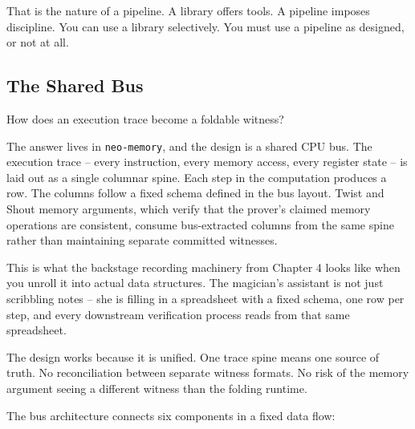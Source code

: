 \documentclass[
  11pt,
  openany]{report}
\begin{document}
That is the nature of a pipeline. A library offers tools. A pipeline imposes
discipline. You can use a library selectively. You must use a pipeline as
designed, or not at all.

\subsection{The Shared Bus}\label{the-shared-bus}

How does an execution trace become a foldable witness?

The answer lives in \texttt{neo-memory}, and the design is a shared CPU bus. The
execution trace -- every instruction, every memory access, every register state
-- is laid out as a single columnar spine. Each step in the computation produces
a row. The columns follow a fixed schema defined in the bus layout. Twist and
Shout memory arguments, which verify that the prover's claimed memory operations
are consistent, consume bus-extracted columns from the same spine rather than
maintaining separate committed witnesses.

This is what the backstage recording machinery from Chapter 4 looks like when
you unroll it into actual data structures. The magician's assistant is not just
scribbling notes -- she is filling in a spreadsheet with a fixed schema, one row
per step, and every downstream verification process reads from that same
spreadsheet.

The design works because it is unified. One trace spine means one source of
truth. No reconciliation between separate witness formats. No risk of the memory
argument seeing a different witness than the folding runtime.

The bus architecture connects six components in a fixed data flow:
\end{document}
